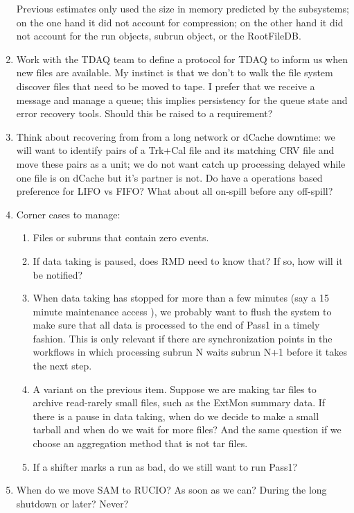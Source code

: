 \begin{enumerate}
    Previous estimates only used the size in memory predicted by the subsystems;
    on the one hand it did not account for compression;
    on the other hand it did not account for the run objects, subrun object, or the RootFileDB.
  \item Work with the TDAQ team to define a protocol for TDAQ to inform us when new files are available.
    My instinct is that we don't to walk the file system discover files that need to be moved to tape.
    I prefer that we receive a message and manage a queue; this implies persistency for the queue state
    and error recovery tools.
    Should this be raised to a requirement?
  \item Think about recovering from from a long network or dCache downtime:
    we will want to identify pairs of a Trk+Cal file and its matching CRV file and move these pairs as a unit;
    we do not want catch up processing delayed while one file is on dCache but it's partner is not.
    Do have a operations based preference for LIFO vs FIFO? What about all on-spill before any off-spill?
  \item Corner cases to manage:
    \begin{enumerate}
      \item Files or subruns that contain zero events.
      \item If data taking is paused, does RMD need to know that?  If so, how will it be notified?
      \item When data taking has stopped for more than a few minutes (say a 15 minute maintenance access ),
        we probably want to flush the system to make sure that all data is processed to the end of Pass1
        in a timely fashion.
        This is only relevant if there are synchronization points in the workflows in which processing
        subrun N waits subrun N+1 before it takes the next step.
      \item A variant on the previous item.  Suppose we are making tar files to archive read-rarely small
        files, such as the ExtMon summary data.
        If there is a pause in data taking, when do we decide to make a small tarball and when
        do we wait for more files?  And the same question if we choose an aggregation method that is not
        tar files.
      \item If a shifter marks a run as bad, do we still want to run Pass1?
    \end{enumerate}
  \item   When do we move SAM to RUCIO? As soon as we can? During the long shutdown or later?  Never?

\end{enumerate}
